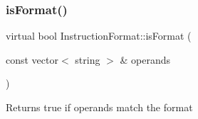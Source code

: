\mbox{\label{classInstructionFormat_a9fdcf94dcd7d9a55ba86e7a63f04d1fe}} 
\subsubsection{\texorpdfstring{is\+Format()}{isFormat()}}
{\footnotesize\ttfamily virtual bool Instruction\+Format\+::is\+Format (\begin{DoxyParamCaption}\item[{const vector$<$ string $>$ \&}]{operands }\end{DoxyParamCaption})\hspace{0.3cm}{\ttfamily [pure virtual]}}

Returns true if operands match the format 

